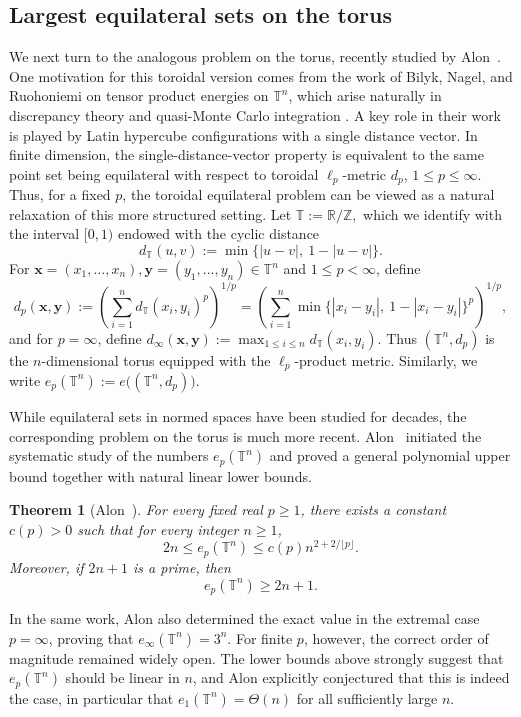 \documentclass[11pt]{article}
\newtheorem{theorem}{Theorem}[section]
\theoremstyle{definition}
\newcommand{\T}{\mathbb T}
\newcommand{\R}{\mathbb R}
\newcommand{\Z}{\mathbb Z}
\begin{document}
\subsection{Largest equilateral sets on the torus}
We next turn to the analogous problem on the torus, recently studied by Alon~\cite{2026AlonTorus}. 
One motivation for this toroidal version comes from
the work of Bilyk, Nagel, and Ruohoniemi on tensor product energies on
\(\mathbb T^n\), which arise naturally in discrepancy theory and
quasi-Monte Carlo integration \cite{BilykNagelRuohoniemi}.  
A key role in their work is played by Latin hypercube configurations with a
single distance vector.  In finite dimension, the single-distance-vector
property is equivalent to the same point set being equilateral with respect to
toroidal \(\ell_p\)-metric \(d_p\), \(1\le p\le\infty\).  Thus, for a
fixed \(p\), the toroidal equilateral problem can be viewed as a natural
relaxation of this more structured setting.
Let
\(
\T:=\R/\Z,
\)
which we identify with the interval $[0,1)$ endowed with the cyclic distance
\[
d_{\T}(u,v):=\min\{|u-v|,\ 1-|u-v|\}.
\]
For $\boldsymbol{x}=(x_1,\dots,x_n),\boldsymbol{y}=(y_1,\dots,y_n)\in \T^n$ and $1\le p<\infty$, define
\[
d_p(\boldsymbol{x},\boldsymbol{y})
:=
\left(\sum_{i=1}^n d_{\T}(x_i,y_i)^p\right)^{1/p}
=
\left(\sum_{i=1}^n \min\{|x_i-y_i|,\ 1-|x_i-y_i|\}^p\right)^{1/p},
\]
and for $p=\infty$, define
\(
d_{\infty}(\boldsymbol{x},\boldsymbol{y})
:=
\max_{1\le i\le n} d_{\T}(x_i,y_i).
\)
Thus $(\T^n,d_p)$ is the $n$-dimensional torus equipped with the $\ell_p$-product metric.
Similarly, we write
\(
e_p(\T^n):=e\bigl((\T^n,d_p)\bigr).
\)

While equilateral sets in normed spaces have been studied for decades, the
corresponding problem on the torus is much more recent. Alon~\cite{2026AlonTorus}
initiated the systematic study of the numbers \(e_p(\T^n)\) and proved a general
polynomial upper bound together with natural linear lower bounds.
\begin{theorem}[Alon~\cite{2026AlonTorus}]
\label{thm:Alon_torus_lp}
For every fixed real $p\ge 1$, there exists a constant $c(p)>0$ such that for every integer $n\ge 1$,
\[
2n\le e_p(\T^n)\le c(p)n^{2+2/\lfloor p\rfloor}.
\]
Moreover, if $2n+1$ is a prime, then
\[
e_p(\T^n)\ge 2n+1.
\]
\end{theorem}
In the same work, Alon also determined the exact value in the extremal case $p=\infty$, proving that
\(
e_{\infty}(\T^n)=3^n.
\)
For finite $p$, however, the correct order of magnitude remained widely open. 
The lower bounds above strongly suggest that $e_p(\T^n)$ should be linear in $n$, and Alon explicitly conjectured that this is indeed the case, in particular that
\(
e_1(\T^n)=\Theta(n)
\)
for all sufficiently large $n$.
\end{document}
